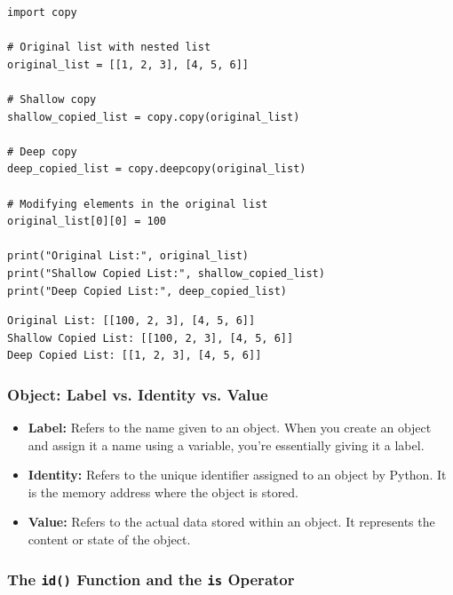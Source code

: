 \begin{codebox}
\begin{verbatim}
import copy

# Original list with nested list
original_list = [[1, 2, 3], [4, 5, 6]]

# Shallow copy
shallow_copied_list = copy.copy(original_list)

# Deep copy
deep_copied_list = copy.deepcopy(original_list)

# Modifying elements in the original list
original_list[0][0] = 100

print("Original List:", original_list)
print("Shallow Copied List:", shallow_copied_list)
print("Deep Copied List:", deep_copied_list)
\end{verbatim}
\end{codebox}

\begin{verbatim}
Original List: [[100, 2, 3], [4, 5, 6]]
Shallow Copied List: [[100, 2, 3], [4, 5, 6]]
Deep Copied List: [[1, 2, 3], [4, 5, 6]]
\end{verbatim}

\newpage
\subsubsection{Object: Label vs. Identity vs. Value}
\begin{itemize}
    \item \textbf{Label:} Refers to the name given to an object. When you create an object and assign it a name using a variable, you're essentially giving it a label.
    
    \item \textbf{Identity:} Refers to the unique identifier assigned to an object by Python. It is the memory address where the object is stored.
    
    \item \textbf{Value:} Refers to the actual data stored within an object. It represents the content or state of the object.
\end{itemize}

\subsubsection{The \texttt{id()} Function and the \texttt{is} Operator}

